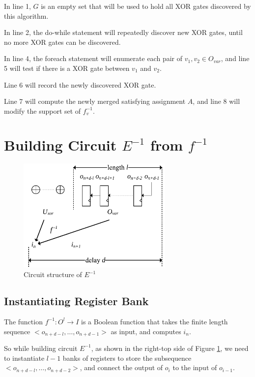 \documentclass[journal]{IEEEtran}
\begin{document}
In line 1,
$G$ is an empty set that will be used to hold all XOR gates discovered by this algorithm.

In line 2, the do-while statement will repeatedly discover new XOR gates,
until no more XOR gates can be discovered.

In line 4,
the foreach statement will enumerate each pair of $v_1,v_2\in O_{var}$,
and line 5 will test if there is a XOR gate between $v_1$ and $v_2$.

Line 6 will record the newly discovered XOR gate.

Line 7 will compute the newly merged satisfying assignment $A$,
and line 8 will modify the support set of $f^{-1}_v$.

\section{Building Circuit $E^{-1}$ from $f^{-1}$}\label{sec_build}
\begin{figure}[!t]
\centering
\includegraphics[width=3in]{reg_bank}
\caption{Circuit structure of $E^{-1}$}
\label{reg_bank}
\end{figure}

\subsection{Instantiating Register Bank}
The function $f^{-1}:O^l\to I$ is a Boolean function that takes the finite length sequence $<o_{n+d-l},\dots , o_{n+d-1} >$ as input,
and computes $i_n$.

So while building circuit $E^{-1}$,
as shown in the right-top side of Figure \ref{reg_bank},
we need to instantiate $l-1$ banks of registers to store the subsequence $<o_{n+d-l},\dots , o_{n+d-2} >$,
and connect the output of $o_i$ to the input of $o_{i-1}$.
\end{document}

